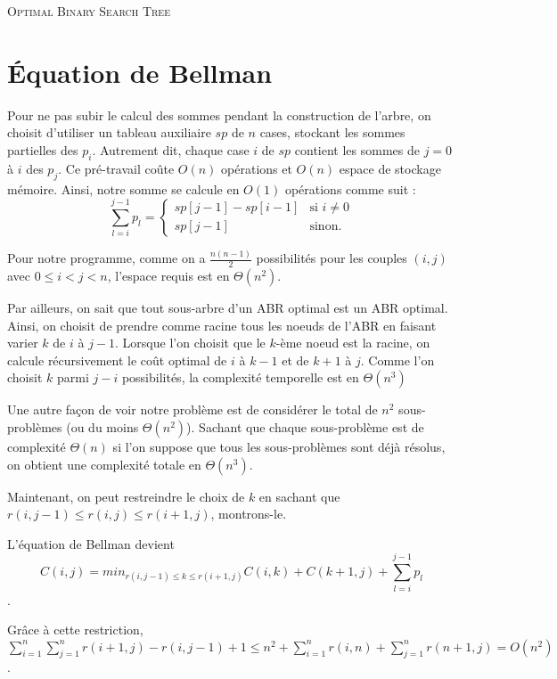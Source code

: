 \documentclass[12pt,a4paper]{article}
\begin{document}
	\begin{center}
		\textsc{\Large Optimal Binary Search Tree}\\[0.25cm]
	\end{center}
	\section{Équation de Bellman}
	Pour ne pas subir le calcul des sommes pendant la construction de l'arbre, on choisit d'utiliser un tableau auxiliaire $sp$ de $n$ cases, stockant les sommes partielles des $p_i$. Autrement dit, chaque case $i$ de $sp$ contient les sommes de $j = 0$ à $i$ des $p_j$. Ce pré-travail coûte $O(n)$ opérations et $O(n)$ espace de stockage mémoire. Ainsi, notre somme se calcule en $O(1)$ opérations	 comme suit : $$\sum \limits_{l = i}^{j - 1} p_l =
	\left\{
		\begin{array}{ll}
		    sp[j - 1] - sp[i - 1] & \mbox{si } i \neq 0 \\
		    sp[j - 1] & \mbox{sinon.}
		\end{array}
	\right.$$

	Pour notre programme, comme on a $\frac{n(n-1)}{2}$ possibilités pour les couples $(i, j)$ avec $0 \leq i < j < n$, l'espace requis est en $\Theta(n^2)$.

	Par ailleurs, on sait que tout sous-arbre d'un ABR optimal est un ABR optimal. Ainsi, on choisit de prendre comme racine tous les noeuds de l'ABR en faisant varier $k$ de $i$ à $j - 1$. Lorsque l'on choisit que le $k$-ème noeud est la racine, on calcule récursivement le coût optimal de $i$ à $k - 1$ et de $k + 1$ à $j$. Comme l'on choisit $k$ parmi $j - i$ possibilités, la complexité temporelle est en $\Theta(n^3)$

	Une autre façon de voir notre problème est de considérer le total de $n^2$ sous-problèmes (ou du moins $\Theta(n^2)$). Sachant que chaque sous-problème est de complexité $\Theta(n)$ si l'on suppose que tous les sous-problèmes sont déjà résolus, on obtient une complexité totale en $\Theta(n^3)$.

	Maintenant, on peut restreindre le choix de $k$ en sachant que $r(i, j - 1) \leq r(i, j) \leq r(i + 1, j)$, montrons-le. 

	L'équation de Bellman devient $$C(i, j) = min_{r(i, j - 1) \leq k \leq r(i + 1, j)} C(i, k) + C(k + 1, j) + \sum \limits_{l = i}^{j - 1} p_l$$.

	Grâce à cette restriction, $\sum \limits_{i = 1}^{n} \sum \limits_{j = 1}^{n} r(i + 1, j) - r(i, j - 1) + 1 \leq n^2 + \sum \limits_{i = 1}^{n} r(i, n) + \sum \limits_{j = 1}^{n} r(n + 1, j) = O(n^2)$.
\end{document}
